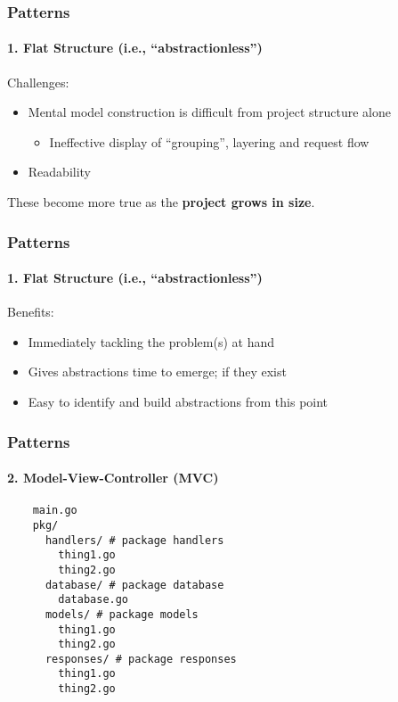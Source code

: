 \begin{frame}[fragile]
  \frametitle{Patterns}
  \framesubtitle{1. Flat Structure (i.e., ``abstractionless'')}

  Challenges:
  \begin{itemize}
    \pause
    \item Mental model construction is difficult from project structure alone
    \begin{itemize}
      \item Ineffective display of ``grouping'', layering and request flow
    \end{itemize}
    \pause
    \item Readability
  \end{itemize}

  \vspace{1em}
  \centering
  \pause
  These become more true as the \textbf{project grows in size}.

\end{frame}

\begin{frame}[fragile]
  \frametitle{Patterns}
  \framesubtitle{1. Flat Structure (i.e., ``abstractionless'')}

  Benefits:
  \begin{itemize}
    \pause
    \item Immediately tackling the problem(s) at hand
    \pause
    \item Gives abstractions time to emerge; if they exist
    \pause
    \item Easy to identify and build abstractions from this point
  \end{itemize}

\end{frame}

\begin{frame}[fragile]
  \frametitle{Patterns}
  \framesubtitle{2. Model-View-Controller (MVC)}

  \begin{verbatim}
    main.go
    pkg/
      handlers/ # package handlers
        thing1.go
        thing2.go
      database/ # package database
        database.go
      models/ # package models
        thing1.go
        thing2.go
      responses/ # package responses
        thing1.go
        thing2.go
  \end{verbatim}
\end{frame}

